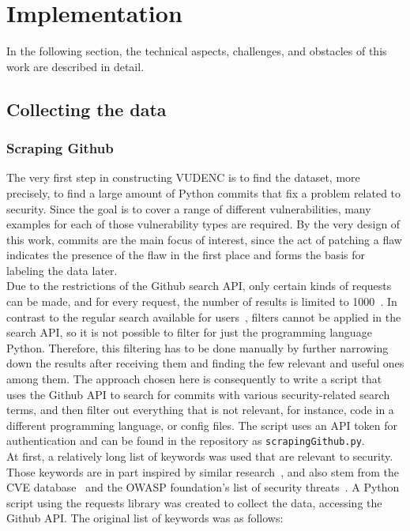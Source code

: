 \documentclass[
a4paper,
pagesize,
pdftex,
12pt,
ngerman,
fleqn,
final,
]{scrartcl}
\begin{document}
	
	
	\newpage
	\section{Implementation}\label{Implementation}
	In the following section, the technical aspects, challenges, and obstacles of this work are described in detail.
	
	\subsection{Collecting the data}
	\subsubsection{Scraping Github}
	The very first step in constructing VUDENC is to find the dataset, more precisely, to find a large amount of Python commits that fix a problem related to security. Since the goal is to cover a range of different vulnerabilities, many examples for each of those vulnerability types are required. By the very design of this work, commits are the main focus of interest, since the act of patching a flaw indicates the presence of the flaw in the first place and forms the basis for labeling the data later.\\	
	Due to the restrictions of the Github search API, only certain kinds of requests can be made, and for every request, the number of results is limited to 1000~\cite{Github.com.2}. In contrast to the regular search available for users~\cite{Github.com.2019}, filters cannot be applied in the search API, so it is not possible to filter for just the programming language Python. Therefore, this filtering has to be done manually by further narrowing down the results after receiving them and finding the few relevant and useful ones among them.
	The approach chosen here is consequently to write a script that uses the Github API to search for commits with various security-related search terms, and then filter out everything that is not relevant, for instance, code in a different programming language, or config files. The script uses an API token for authentication and can be found in the repository as \texttt{scrapingGithub.py}.\\
	At first, a relatively long list of keywords was used that are relevant to security. Those keywords are in part inspired by similar research~\cite{Zhou.2017}, and also stem from the CVE database~\cite{CVE} and the OWASP foundation's list of security threats~\cite{OWASPFoundation.}. A Python script using the requests library was created to collect the data, accessing the Github API. The original list of keywords was as follows:
	\lstset{basicstyle=\small}
	
\end{document}

